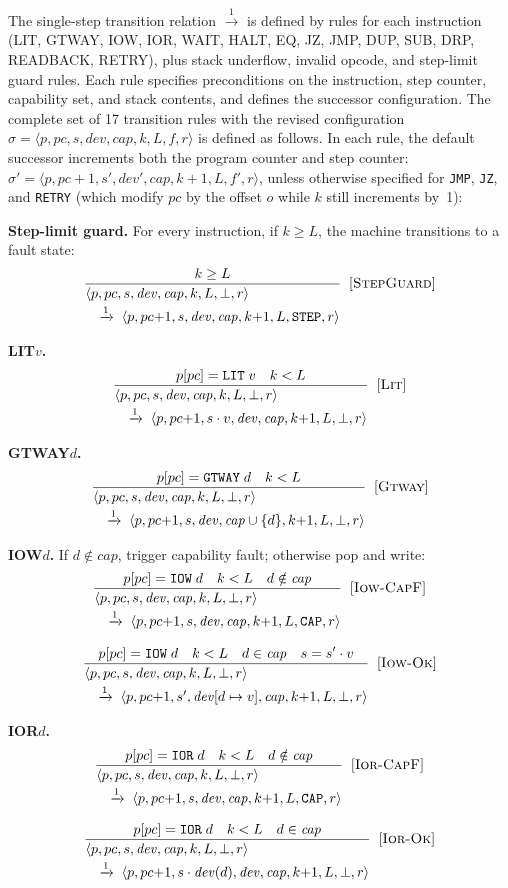 \documentclass[a4paper,fleqn,longmktitle]{cas-dc}
\makeatletter
\newcommand{\irule}[4]{%
  \[
  \frac{\displaystyle #1}
       {\displaystyle
        \begin{array}{@{}l@{}}
          #2 \\[2pt]
          \quad\xrightarrow{1}\; #3
        \end{array}}
  \;\;[\textsc{#4}]
  \]%
}
\makeatother
\begin{document}
{\footnotesize
The single-step transition relation $\xrightarrow{1}$ is defined by rules for each instruction (LIT, GTWAY, IOW, IOR, WAIT, HALT, EQ, JZ, JMP, DUP, SUB, DRP, READBACK, RETRY), plus stack underflow, invalid opcode, and step-limit guard rules. Each rule specifies preconditions on the instruction, step counter, capability set, and stack contents, and defines the successor configuration. The complete set of 17 transition rules with the revised configuration $\sigma = \langle p, pc, s, \mathit{dev}, \mathit{cap}, k, L, f, r \rangle$ is defined as follows. In each rule, the default successor increments both the program counter and step counter: $\sigma' = \langle p, pc{+}1, s', \mathit{dev}', \mathit{cap}, k{+}1, L, f', r \rangle$, unless otherwise specified for \texttt{JMP}, \texttt{JZ}, and \texttt{RETRY} (which modify $pc$ by the offset $o$ while $k$ still increments by~1):

\noindent\textbf{Step-limit guard.} For every instruction, if $k \geq L$, the machine transitions to a fault state:
\irule{k \geq L}
      {\langle p, pc, s, \mathit{dev}, \mathit{cap}, k, L, \bot, r \rangle}
      {\langle p, pc{+}1, s, \mathit{dev}, \mathit{cap}, k{+}1, L, \texttt{STEP}, r \rangle}
      {StepGuard}

\noindent\textbf{LIT\;$v$.}
\irule{p[pc] = \texttt{LIT}\;v \quad k < L}
      {\langle p, pc, s, \mathit{dev}, \mathit{cap}, k, L, \bot, r \rangle}
      {\langle p, pc{+}1, s \cdot v, \mathit{dev}, \mathit{cap}, k{+}1, L, \bot, r \rangle}
      {Lit}

\noindent\textbf{GTWAY\;$d$.}
\irule{p[pc] = \texttt{GTWAY}\;d \quad k < L}
      {\langle p, pc, s, \mathit{dev}, \mathit{cap}, k, L, \bot, r \rangle}
      {\langle p, pc{+}1, s, \mathit{dev}, \mathit{cap} \cup \{d\}, k{+}1, L, \bot, r \rangle}
      {Gtway}

\noindent\textbf{IOW\;$d$.} If $d \notin \mathit{cap}$, trigger capability fault; otherwise pop and write:
\irule{p[pc] = \texttt{IOW}\;d \quad k < L \quad d \notin \mathit{cap}}
      {\langle p, pc, s, \mathit{dev}, \mathit{cap}, k, L, \bot, r \rangle}
      {\langle p, pc{+}1, s, \mathit{dev}, \mathit{cap}, k{+}1, L, \texttt{CAP}, r \rangle}
      {Iow-CapF}
\irule{p[pc] = \texttt{IOW}\;d \quad k < L \quad d \in \mathit{cap} \quad s = s' \cdot v}
      {\langle p, pc, s, \mathit{dev}, \mathit{cap}, k, L, \bot, r \rangle}
      {\langle p, pc{+}1, s', \mathit{dev}[d \mapsto v], \mathit{cap}, k{+}1, L, \bot, r \rangle}
      {Iow-Ok}

\noindent\textbf{IOR\;$d$.}
\irule{p[pc] = \texttt{IOR}\;d \quad k < L \quad d \notin \mathit{cap}}
      {\langle p, pc, s, \mathit{dev}, \mathit{cap}, k, L, \bot, r \rangle}
      {\langle p, pc{+}1, s, \mathit{dev}, \mathit{cap}, k{+}1, L, \texttt{CAP}, r \rangle}
      {Ior-CapF}
\irule{p[pc] = \texttt{IOR}\;d \quad k < L \quad d \in \mathit{cap}}
      {\langle p, pc, s, \mathit{dev}, \mathit{cap}, k, L, \bot, r \rangle}
      {\langle p, pc{+}1, s \cdot \mathit{dev}(d), \mathit{dev}, \mathit{cap}, k{+}1, L, \bot, r \rangle}
      {Ior-Ok}

}
\end{document}
